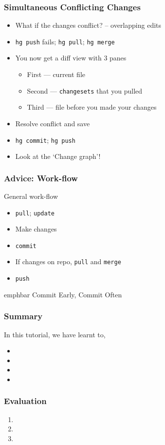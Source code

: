 \documentclass[12pt,compress]{beamer}
\newcommand{\emphbar}[1]
{\begin{beamercolorbox}[rounded=true]{emphbar} 
      {#1}
 \end{beamercolorbox}
}
\newcommand{\typ}[1]{\lstinline{#1}}
\begin{document}
\begin{frame}
  \frametitle{Simultaneous Conflicting Changes}
\label{sec-11}

  \begin{itemize}
  \item What if the changes conflict? -- overlapping edits
  \item \typ{hg push} fails; \typ{hg pull}; \typ{hg merge}
  \item You now get a diff view with 3 panes 
    \begin{itemize}
    \item First --- current file
    \item Second --- \typ{changesets} that you pulled
    \item Third --- file before you made your changes
    \end{itemize}
  \item Resolve conflict and save
  \item \typ{hg commit}; \typ{hg push}
  \item Look at the `Change graph'!
  \end{itemize}
\end{frame}
\begin{frame}
  \frametitle{\alert{Advice}: Work-flow}
\label{sec-11}

  General work-flow
  \begin{itemize}
  \item \typ{pull}; \typ{update}
  \item Make changes
  \item \typ{commit}
  \item If changes on repo, \typ{pull} and \typ{merge}
  \item \typ{push}
  \end{itemize}
  \emphbar{Commit Early, Commit Often}
\end{frame}
\begin{frame}
\frametitle{Summary}
\label{sec-12}

  In this tutorial, we have learnt to,

\begin{itemize}
\item 
\item 
\item 
\item 
\end{itemize}
\end{frame}
\begin{frame}[fragile]
\frametitle{Evaluation}
\label{sec-13}

\begin{enumerate}
\item 
\item 
\item 
\end{enumerate}
\end{frame}
\end{document}
